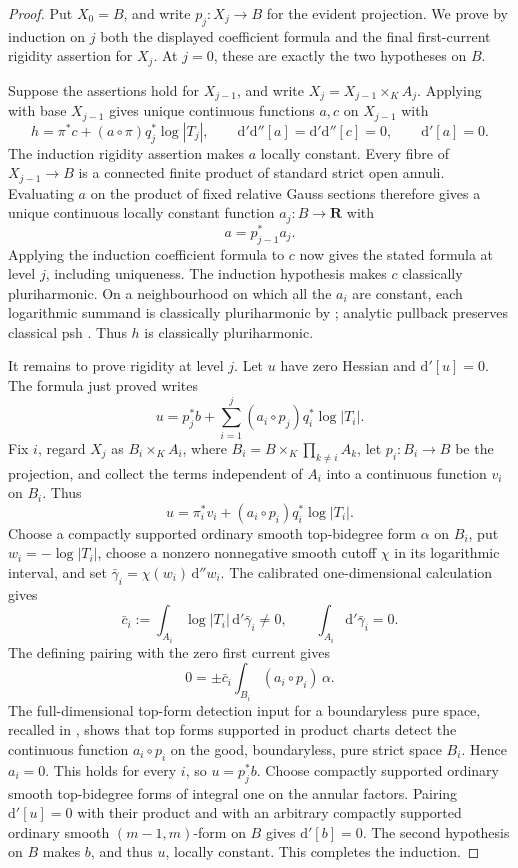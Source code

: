 \begin{proof}
Put \(X_0=B\), and write \(p_j:X_j\to B\) for the evident projection.
We prove by induction on \(j\) both the displayed
coefficient formula and the final first-current rigidity assertion for
\(X_j\).  At \(j=0\), these are exactly the two hypotheses on \(B\).

Suppose the assertions hold for \(X_{j-1}\), and write
\(X_j=X_{j-1}\times_KA_j\).  Applying
 with base \(X_{j-1}\) gives
unique continuous functions \(a,c\) on \(X_{j-1}\) with
\[
 h=\pi^*c+(a\circ\pi)q_j^*\log|T_j|,
 \qquad
 \mathrm d'\mathrm d''[a]=\mathrm d'\mathrm d''[c]=0,
 \qquad
 \mathrm d'[a]=0.
\]
The induction rigidity assertion makes \(a\) locally constant.  Every
fibre of \(X_{j-1}\to B\) is a connected finite product of standard strict
open annuli.  Evaluating \(a\) on the product of fixed relative Gauss
sections therefore gives a unique continuous locally constant function
\(a_j:B\to\mathbf R\) with
\[
                             a=p_{j-1}^*a_j.
\]
Applying the induction coefficient formula to \(c\) now gives the stated
formula at level \(j\), including uniqueness.  The induction hypothesis
makes \(c\) classically pluriharmonic.  On a neighbourhood on which all
the \(a_i\) are constant, each logarithmic summand is classically
pluriharmonic by
; analytic
pullback preserves classical psh \cite[Proposition~4.2(6)]{GR25Classical}.
Thus \(h\) is classically pluriharmonic.

It remains to prove rigidity at level \(j\).  Let \(u\) have zero Hessian
and \(\mathrm d'[u]=0\).  The formula just proved writes
\[
 u=p_j^*b+\sum_{i=1}^j(a_i\circ p_j)q_i^*\log|T_i|.
\]
Fix \(i\), regard \(X_j\) as \(B_i\times_KA_i\), where
\(B_i=B\times_K\prod_{k\ne i}A_k\), let \(p_i:B_i\to B\) be the
projection, and collect the terms independent of \(A_i\) into a continuous
function \(v_i\) on \(B_i\).  Thus
\[
 u=\pi_i^*v_i+(a_i\circ p_i)q_i^*\log|T_i|.
\]
Choose a compactly supported ordinary smooth top-bidegree form \(\alpha\)
on \(B_i\), put \(w_i=-\log|T_i|\), choose a nonzero nonnegative smooth
cutoff \(\chi\) in its logarithmic interval, and set
\(\bar\gamma_i=\chi(w_i)\,\mathrm d''w_i\).  The calibrated
one-dimensional calculation gives
\[
 \bar c_i:=\int_{A_i}\log|T_i|\,\mathrm d'\bar\gamma_i\ne0,
 \qquad
 \int_{A_i}\mathrm d'\bar\gamma_i=0.
\]
The defining pairing with the zero first current gives
\[
 0=\mathord\pm\bar c_i\int_{B_i}(a_i\circ p_i)\,\alpha.
\]
The full-dimensional top-form detection input for a boundaryless pure space,
recalled in , shows that top forms supported
in product charts detect the continuous function \(a_i\circ p_i\) on the
good, boundaryless, pure strict space \(B_i\).  Hence \(a_i=0\).  This holds
for every \(i\), so \(u=p_j^*b\).  Choose compactly supported
ordinary smooth top-bidegree forms of integral one on the annular factors.
Pairing \(\mathrm d'[u]=0\) with their product and with an arbitrary
compactly supported ordinary smooth \((m-1,m)\)-form on \(B\) gives
\(\mathrm d'[b]=0\).  The second hypothesis on \(B\) makes \(b\), and
thus \(u\), locally constant.  This completes the induction.
\end{proof}

